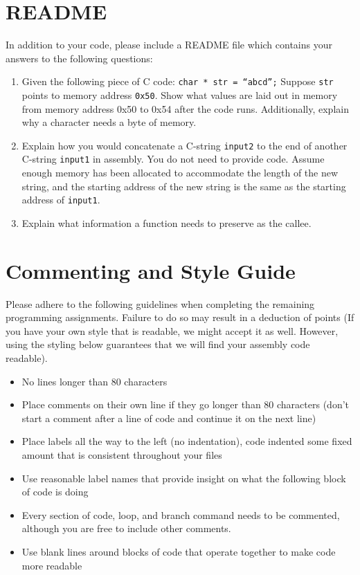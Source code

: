 \documentclass{article}
\begin{document}
\section{README}
In addition to your code, please include a README file which contains your
answers to the following questions:
\begin{enumerate}
\item Given the following piece of C code: {\tt char * str = ``abcd'';} \newline Suppose {\tt str} points to memory address {\tt 0x50}. Show what values are laid out in memory from memory address 0x50 to 0x54 after the code runs. Additionally, explain why a character needs a byte of memory.
\item Explain how you would concatenate a C-string {\tt input2} to the end of another C-string {\tt input1} in assembly. You do not need to provide code. Assume enough memory has been allocated to accommodate the length of the new string, and the starting address of the new string is the same as the starting address of {\tt input1}.
\item Explain what information a function needs to preserve as the callee.  
\end{enumerate}
\section{Commenting and Style Guide}
Please adhere to the following guidelines when completing the remaining programming assignments. Failure to do so may result in a deduction of points (If you have your own style that is readable, we might accept it as well. However, using the styling below guarantees that we will find your assembly code readable).
 
\begin{itemize}
\item No lines longer than 80 characters
\item Place comments on their own line if they go longer than 80 characters (don't start a comment after a line of code and continue it on the next line)
\item Place labels all the way to the left (no indentation), code indented some fixed amount that is consistent throughout your files
\item Use reasonable label names that provide insight on what the following block of code is doing
\item Every section of code, loop, and branch command needs to be commented, although you are free to include other comments.
\item Use blank lines around blocks of code that operate together to make code more readable
\end{itemize}
\end{document}
